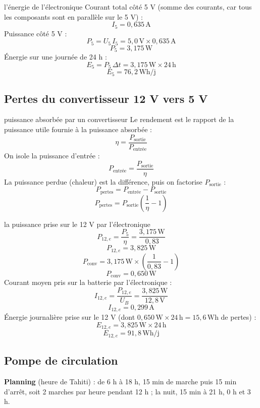 \documentclass[11pt,a4paper]{article}
\newcommand{\U}[1]{\,\mathrm{#1}}
\begin{document}
\begin{calcul}{l'énergie de l'électronique}
Courant total côté 5 V (somme des courants, car tous les composants sont en parallèle sur le 5 V) :
\[
I_5 = 0{,}635\U{A}
\]
Puissance côté 5 V :
\[
P_5 = U_5 \, I_5 = 5{,}0\U{V} \times 0{,}635\U{A}
\]
\[
P_5 = 3{,}175\U{W}
\]
Énergie sur une journée de 24 h :
\[
E_5 = P_5 \, \Delta t = 3{,}175\U{W} \times 24\U{h}
\]
\[
E_5 = 76{,}2\U{Wh/j}
\]
\end{calcul}

\subsection{Pertes du convertisseur 12 V vers 5 V}

\begin{demo}{puissance absorbée par un convertisseur}
Le rendement est le rapport de la puissance utile fournie à la puissance absorbée :
\[
\eta = \frac{P_{\text{sortie}}}{P_{\text{entrée}}}
\]
On isole la puissance d'entrée :
\[
P_{\text{entrée}} = \frac{P_{\text{sortie}}}{\eta}
\]
La puissance perdue (chaleur) est la différence, puis on factorise $P_{\text{sortie}}$ :
\[
P_{\text{pertes}} = P_{\text{entrée}} - P_{\text{sortie}}
\]
\[
P_{\text{pertes}} = P_{\text{sortie}} \left( \frac{1}{\eta} - 1 \right)
\]
\end{demo}

\begin{calcul}{la puissance prise sur le 12 V par l'électronique}
\[
P_{12,e} = \frac{P_5}{\eta} = \frac{3{,}175\U{W}}{0{,}83}
\]
\[
P_{12,e} = 3{,}825\U{W}
\]
\[
P_{\text{conv}} = 3{,}175\U{W} \times \left( \frac{1}{0{,}83} - 1 \right)
\]
\[
P_{\text{conv}} = 0{,}650\U{W}
\]
Courant moyen pris sur la batterie par l'électronique :
\[
I_{12,e} = \frac{P_{12,e}}{U_B} = \frac{3{,}825\U{W}}{12{,}8\U{V}}
\]
\[
I_{12,e} = 0{,}299\U{A}
\]
Énergie journalière prise sur le 12 V (dont $0{,}650\U{W} \times 24\U{h} = 15{,}6\U{Wh}$ de pertes) :
\[
E_{12,e} = 3{,}825\U{W} \times 24\U{h}
\]
\[
E_{12,e} = 91{,}8\U{Wh/j}
\]
\end{calcul}

\subsection{Pompe de circulation}

\textbf{Planning} (heure de Tahiti) : de 6 h à 18 h, 15 min de marche puis 15 min d'arrêt, soit 2 marches par heure pendant 12 h ; la nuit, 15 min à 21 h, 0 h et 3 h.
\end{document}
